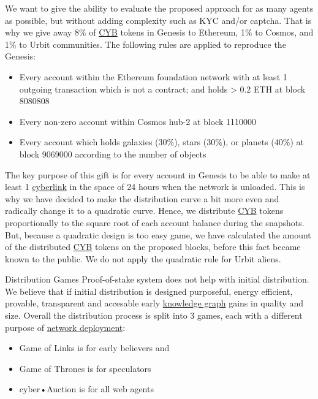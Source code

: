 \documentclass[8pt,oneside]{amsart}
\makeatletter
\newcommand{\linkred}[2]{\href{#1}{\color{red}{#2}}}
\renewcommand\subsection{\@startsection{subsection}
                                    {2}{\z@}
                                    {-3.25ex\@plus -1ex \@minus -.2ex}
                                    {0ex \@plus .2ex}
                                    {\play\Large}
                        }
\newcommand{\titleSection}[1]{\subsection{#1}}
\makeatother
\begin{document}
We want to give the ability to evaluate the proposed approach for as many agents as possible, but without adding complexity such as KYC and/or captcha. That is why we give away 8\% of {\hyperref[cyb]{CYB}} tokens in Genesis to Ethereum, 1\% to Cosmos, and 1\% to Urbit communities. The following rules are applied to reproduce the Genesis:
\begin{itemize}
 \item Every account within the Ethereum foundation network with at least 1 outgoing transaction which is not a contract; and holds > 0.2 ETH at block 8080808
 \item Every non-zero account within Cosmos hub-2 at block 1110000
 \item Every account which holds galaxies (30\%), stars (30\%), or planets (40\%) at block 9069000 according to the number of objects
\end{itemize}

The key purpose of this gift is for every account in Genesis to be able to make at least 1 {\hyperref[cyberlinks]{cyberlink}} in the space of 24 hours when the network is unloaded. This is why we have decided to make the distribution curve a bit more even and radically change it to a quadratic curve. Hence, we distribute {\hyperref[cyb]{CYB}} tokens proportionally to the square root of each account balance during the snapshots. But, because a quadratic design is too easy game, we have calculated the amount of the distributed {\hyperref[cyb]{CYB}} tokens on the proposed blocks, before this fact became known to the public. We do not apply the quadratic rule for Urbit aliens.

\titleSection{Distribution Games}\label{distribution-games}
Proof-of-stake system does not help with initial distribution. We believe that if initial distribution is designed purposeful, energy efficient, provable, transparent and accesable early {\hyperref[knowledge-graph]{knowledge graph}} gains in quality and size. Overall the distribution process is split into 3 games, each with a different purpose of {\hyperref[deployment]{network deployment}}:

\begin{itemize}
\item Game of Links is for early believers and \linkred{https://cybercongress.ai/docs/cyberd/run_validator/}{Genesis validators}
\item Game of Thrones is for speculators
\item cyber•Auction is for all web agents
\end{itemize}
\end{document}
